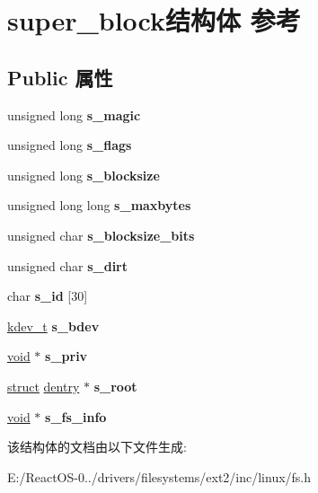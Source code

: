 \hypertarget{structsuper__block}{}\section{super\+\_\+block结构体 参考}
\label{structsuper__block}
\subsection*{Public 属性}
\begin{DoxyCompactItemize}
\item 
\mbox{\label{structsuper__block_a9e077247fbee118a9db2919f1571ff4f}} 
unsigned long {\bfseries s\+\_\+magic}
\item 
\mbox{\label{structsuper__block_aa81e217583e7edbab7216dad02709b1b}} 
unsigned long {\bfseries s\+\_\+flags}
\item 
\mbox{\label{structsuper__block_a77d5874edcce037865e0a9bb4cf82951}} 
unsigned long {\bfseries s\+\_\+blocksize}
\item 
\mbox{\label{structsuper__block_a1bc3ca7146cec4c53c9db1e6b7b3fa4b}} 
unsigned long long {\bfseries s\+\_\+maxbytes}
\item 
\mbox{\label{structsuper__block_a6bc06d86024fd194bf7592a84fab719f}} 
unsigned char {\bfseries s\+\_\+blocksize\+\_\+bits}
\item 
\mbox{\label{structsuper__block_a52e1a19903777b16396bb347d21d843a}} 
unsigned char {\bfseries s\+\_\+dirt}
\item 
\mbox{\label{structsuper__block_a994133c88681710efee85d6d6a8326f8}} 
char {\bfseries s\+\_\+id} \mbox{[}30\mbox{]}
\item 
\mbox{\label{structsuper__block_a2727b846bc40a7bdf7fd732b20988594}} 
\hyperlink{structblock__device}{kdev\+\_\+t} {\bfseries s\+\_\+bdev}
\item 
\mbox{\label{structsuper__block_ae87c5bd09af6d46ba0f3020f68b175f4}} 
\hyperlink{interfacevoid}{void} $\ast$ {\bfseries s\+\_\+priv}
\item 
\mbox{\label{structsuper__block_a099bb52441e2b26cfbc2cd66eb8e26d7}} 
\hyperlink{interfacestruct}{struct} \hyperlink{structdentry}{dentry} $\ast$ {\bfseries s\+\_\+root}
\item 
\mbox{\label{structsuper__block_a3b2516267743f9a3199455aaf9edc9ae}} 
\hyperlink{interfacevoid}{void} $\ast$ {\bfseries s\+\_\+fs\+\_\+info}
\end{DoxyCompactItemize}


该结构体的文档由以下文件生成\+:\begin{DoxyCompactItemize}
\item 
E\+:/\+React\+O\+S-\/0../drivers/filesystems/ext2/inc/linux/fs.\+h\end{DoxyCompactItemize}
